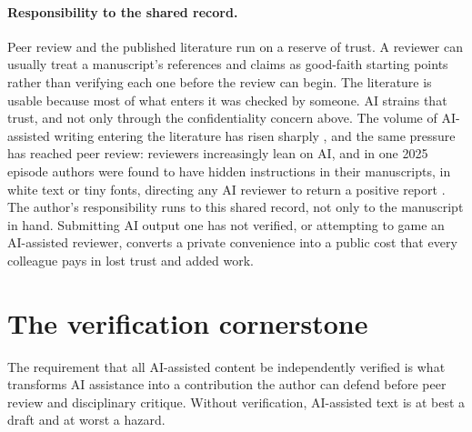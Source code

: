 \documentclass{SIAMbook2023}
\begin{document}
\paragraph{Responsibility to the shared record.}
Peer review and the published literature run on a reserve of trust. A reviewer can usually treat a manuscript's references and claims as good-faith starting points rather than verifying each one before the review can begin. The literature is usable because most of what enters it was checked by someone. AI strains that trust, and not only through the confidentiality concern above. The volume of AI-assisted writing entering the literature has risen sharply \citep{kobak2025delving}, and the same pressure has reached peer review: reviewers increasingly lean on AI, and in one 2025 episode authors were found to have hidden instructions in their manuscripts, in white text or tiny fonts, directing any AI reviewer to return a positive report \citep{lin2025hidden}. The author's responsibility runs to this shared record, not only to the manuscript in hand. Submitting AI output one has not verified, or attempting to game an AI-assisted reviewer, converts a private convenience into a public cost that every colleague pays in lost trust and added work.

\section{The verification cornerstone}
\label{app:sciwriting-verification}%

The requirement that all AI-assisted content be independently verified is what transforms AI assistance into a contribution the author can defend before peer review and disciplinary critique. Without verification, AI-assisted text is at best a draft and at worst a hazard.
\end{document}
